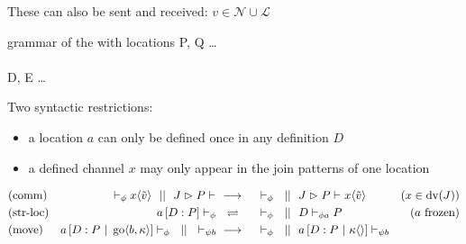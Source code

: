 These can also be sent and received:
$ v \in \mathcal{N} \cup \mathcal{L} $


\begin{JDef}{grammar of the \joincalc with locations}
  P, Q
  \grmr \dots
  \altn {}
  \\ \\
  D, E
  \grmr \dots
  \altn {}
\end{JDef}

Two syntactic restrictions:
\begin{itemize}
  \item a location $a$ can only be defined once in any definition $D$
  \item a defined channel $x$ may only appear in the join patterns of one location
\end{itemize}

\begin{align*}
  \drchamred{comm}{(x \in \dv{J})}{
    \drchamcnf{\phi}{}{\jsnd{x}{\tilde{v}}}
    \drchampar
    \drchamcnf{}{\jrct{J}{P}}{}
  }{
    \drchamcnf{\phi}{}{}
    \drchampar
    \drchamcnf{}{\jrct{J}{P}}{\jsnd{x}{\tilde{v}}}
  }
  \\
  \drchamequ{str-loc}{(a \ \text{frozen)}}{
    \drchamcnf{\phi}{\jloc{a}{D}{P}}{}
  }{
    \drchamcnf{\phi}{}{}
    \drchampar
    \drchamcnf{\phi a}{D}{P}
  }
  \\
  \drchamred{move}{}{
    \drchamcnf{\phi}{\jloc{a}{D}{P \jpar \jgo{b}{\kappa}}}{}
    \drchampar
    \drchamcnf{\psi b}{}{}
  }{
    \drchamcnf{\phi}{}{}
    \drchampar
    \drchamcnf{\psi b}{\jloc{a}{D}{P \jpar \jsnd{\kappa}{}}}{}
  }
\end{align*}
